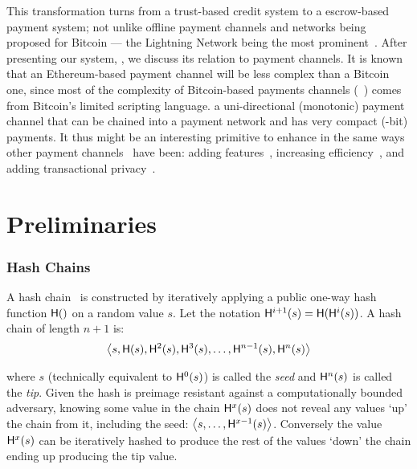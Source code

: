 This transformation turns \pw from a trust-based credit system to a escrow-based payment system; not unlike offline payment channels and networks being proposed for Bitcoin --- the Lightning Network being the most prominent~\cite{PD15}. After presenting our system, \ew, we discuss its relation to payment channels. It is known that an Ethereum-based payment channel will be less complex than a Bitcoin one, since most of the complexity of Bitcoin-based payments channels (\eg {}~\cite{MMSH16}) comes from Bitcoin's limited scripting language. \ew a uni-directional (monotonic) payment channel that can be chained into a payment network and has very compact (-bit) payments. It thus might be an interesting primitive to enhance in the same ways other payment channels~\cite{DW15,PD15} have been: adding features~\cite{KG17}, increasing efficiency~\cite{DEFM17,MBKM17}, and adding transactional privacy~\cite{GM17,MMK+17,HAB+17,RMKG18}.


\section{Preliminaries}

\subsubsection{Hash Chains}

A hash chain~\cite{Lam81} is constructed by iteratively applying a public one-way hash function $\mathsf{H}()$ on a random value $s$. Let the notation $\mathsf{H}^{i+1}(s) = \mathsf{H}(\mathsf{H}^{i}(s))$. A hash chain of length $n+1$ is:
\begin{equation*} \left \langle s,\mathsf{H}(s),\mathsf{H}^{2}(s),\mathsf{H}^{3}(s),\ldots,\mathsf{H}^{n-1}(s),\mathsf{H}^{n}(s) \right \rangle \end{equation*}

where $s$ (technically equivalent to $\mathsf{H}^{0}(s)$) is called the \textit{seed} and $\mathsf{H}^{n}(s)$ is called the \textit{tip}. Given the hash is preimage resistant against a computationally bounded adversary, knowing some value in the chain $\mathsf{H}^{x}(s)$ does not reveal any values `up' the chain from it, including the seed: $\left \langle s,\ldots,\mathsf{H}^{x-1}(s) \right \rangle$. Conversely the value $\mathsf{H}^{x}(s)$ can be iteratively hashed to produce the rest of the values `down' the chain ending up producing the tip value. 

